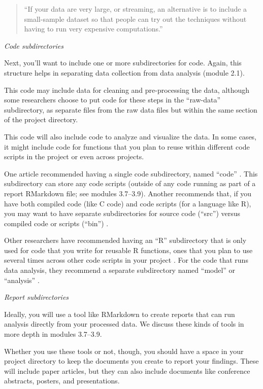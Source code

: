 \documentclass[]{tufte-book}
\begin{document}
\begin{quote}
``If your data are very large, or streaming, an alternative is to include a
small-sample dataset so that people can try out the techniques without having to
run very expensive computations.'' \citep{marwick2018packaging}
\end{quote}

\emph{Code subdirectories}

Next, you'll want to include one or more subdirectories for code. Again, this
structure helps in separating data collection from data analysis (module 2.1).

This code may include data for cleaning and pre-processing the data, although
some researchers choose to put code for these steps in the ``raw-data''
subdirectory, as separate files from the raw data files but within the same
section of the project directory.

This code will also include code to analyze and visualize the data. In some
cases, it might include code for functions that you plan to reuse within
different code scripts in the project or even across projects.

One article recommended having a single code subdirectory, named
``code'' \citep{blischak2019creating}. This subdirectory can
store any code scripts (outside of any code running as part of a report
RMarkdown file; see modules 3.7--3.9). Another recommends that, if you
have both compiled code (like C code) and code scripts (for a language
like R), you may want to have separate subdirectories for source code (``src'')
versus compiled code or scripts (``bin'') \citep{noble2009quick}.

Other researchers have recommended having an ``R'' subdirectory that is only used
for code that you write for reusable R functions, ones that you plan to use
several times across other code scripts in your project \citep{vuorre2021sharing, marwick2018packaging}. For the code that runs data analysis, they recommend a
separate subdirectory named ``model'' \citep{vuorre2021sharing} or ``analysis''
\citep{marwick2018packaging}.

\emph{Report subdirectories}

Ideally, you will use a tool like RMarkdown to create reports that can run
analysis directly from your processed data. We discuss these kinds of tools
in more depth in modules 3.7--3.9.

Whether you use these tools or not, though, you should have a space in your
project directory to keep the documents you create to report your findings.
These will include paper articles, but they can also include documents like
conference abstracts, posters, and presentations.
\end{document}
